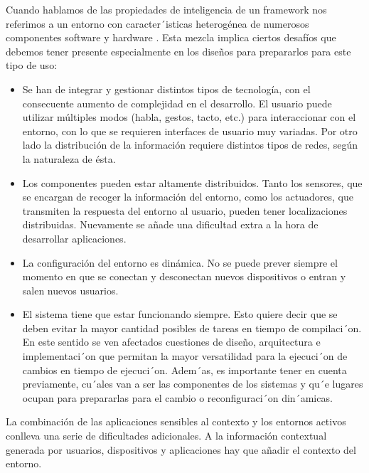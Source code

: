 Cuando hablamos de las propiedades de inteligencia de un framework nos
referimos a un entorno con caracter´isticas  heterogénea de numerosos
componentes software y hardware \cite{cap1.133}. Esta mezcla implica ciertos
desafíos que debemos tener presente especialmente en los dise\~nos para
prepararlos para este tipo de uso:


\begin{itemize}
 
\item
Se han de integrar y gestionar distintos tipos de tecnología, con
el consecuente aumento de complejidad en el desarrollo. El usuario puede
utilizar múltiples modos (habla, gestos, tacto, etc.) para interaccionar con
el entorno, con lo que se requieren interfaces de usuario muy variadas. Por
otro lado la distribución de la información requiere distintos tipos de redes,
según la naturaleza de ésta.

\item
Los componentes pueden estar altamente distribuidos. Tanto los
sensores, que se encargan de recoger la información del entorno, como los
actuadores, que transmiten la respuesta del entorno al usuario, pueden
tener localizaciones distribuidas. Nuevamente se añade una dificultad extra a la
hora de desarrollar aplicaciones.

\item
La configuración del entorno es dinámica. No se puede prever siempre
el momento en que se conectan y desconectan nuevos dispositivos o entran
y salen nuevos usuarios.

\item
El sistema tiene que estar funcionando siempre. Esto quiere decir que se
deben evitar la mayor cantidad posibles de tareas en tiempo de compilaci´on. En
este sentido se ven afectados cuestiones de dise\~no, arquitectura e
implementaci´on que permitan la mayor versatilidad para la ejecuci´on de
cambios en tiempo de ejecuci´on. Adem´as, es importante tener en cuenta
previamente, cu´ales van a ser las componentes de los sistemas y qu´e lugares
ocupan para prepararlas para el cambio o reconfiguraci´on din´amicas. 

\end{itemize}

La combinación de las aplicaciones sensibles al contexto y los entornos activos
conlleva una serie de dificultades adicionales. A la información contextual
generada por usuarios, dispositivos y aplicaciones hay que añadir el contexto
del entorno.

